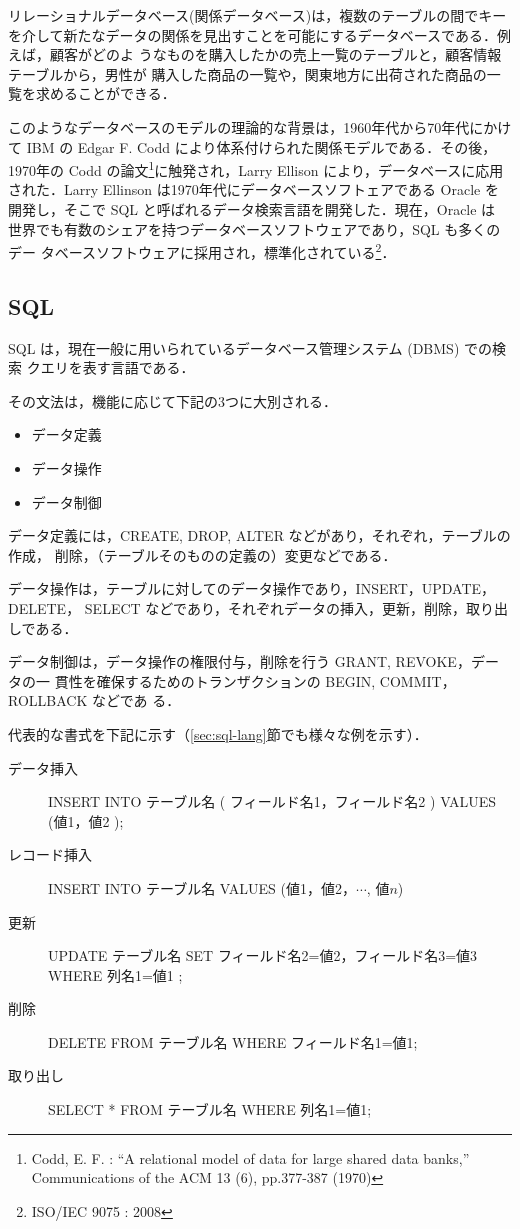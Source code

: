 リレーショナルデータベース(関係データベース)は，複数のテーブルの間でキーを介して新たなデータの関係を見出すことを可能にするデータベースである．例えば，顧客がどのよ
うなものを購入したかの売上一覧のテーブルと，顧客情報テーブルから，男性が
購入した商品の一覧や，関東地方に出荷された商品の一覧を求めることができる．

このようなデータベースのモデルの理論的な背景は，1960年代から70年代にかけ
て IBM の Edgar F. Codd により体系付けられた関係モデルである．その後，
1970年の Codd の論文\footnote{Codd, E. F. : ``A relational model
of data for large shared data banks,'' Communications of the ACM 13 (6),
pp.377-387 (1970)}に触発され，Larry Ellison により，データベースに応用
された．Larry Ellinson は1970年代にデータベースソフトェアである Oracle
を開発し，そこで SQL と呼ばれるデータ検索言語を開発した．現在，Oracle は
世界でも有数のシェアを持つデータベースソフトウェアであり，SQL も多くのデー
タベースソフトウェアに採用され，標準化されている\footnote{ISO/IEC 9075 :
2008}．

\subsection{SQL}

SQL は，現在一般に用いられているデータベース管理システム (DBMS) での検索
クエリを表す言語である．

その文法は，機能に応じて下記の3つに大別される．
\begin{itemize}
 \item データ定義
 \item データ操作
 \item データ制御
\end{itemize}

データ定義には，CREATE, DROP, ALTER などがあり，それぞれ，テーブルの作成，
削除，（テーブルそのものの定義の）変更などである．

データ操作は，テーブルに対してのデータ操作であり，INSERT，UPDATE，DELETE，
SELECT などであり，それぞれデータの挿入，更新，削除，取り出しである．

データ制御は，データ操作の権限付与，削除を行う GRANT, REVOKE，データの一
貫性を確保するためのトランザクションの BEGIN, COMMIT，ROLLBACK などであ
る．

代表的な書式を下記に示す（\ref{sec:sql-lang}節でも様々な例を示す）．

\begin{description}
  \item[データ挿入] 
       INSERT INTO テーブル名 ( フィールド名1，フィールド名2 ) VALUES  (値1，値2 );
 \item[レコード挿入]
       INSERT INTO テーブル名 VALUES (値1，値2，$\cdots$, 値$n$)
 \item[更新]
       UPDATE テーブル名 SET フィールド名2=値2，フィールド名3=値3 WHERE
       列名1=値1 ;
 \item[削除] 
       DELETE FROM テーブル名 WHERE フィールド名1=値1;
 \item[取り出し]  
       SELECT * FROM テーブル名 WHERE 列名1=値1;
\end{description}

